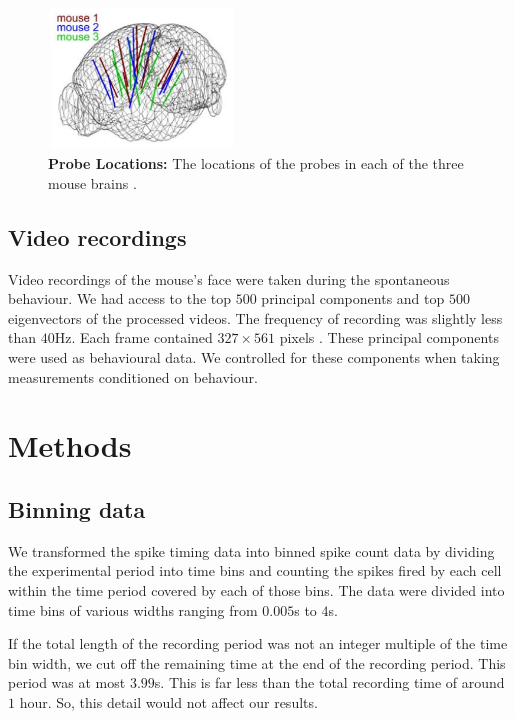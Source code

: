     \begin{figure}[h]
        \centering
        \includegraphics[width=5cm,height=3.75cm]{figures/eight_probe/probe_locations_stringer.png}
        \caption{\textbf{Probe Locations:} The locations of the probes in each of the three mouse brains \parencite{stringer}.}
        \label{fig:probe_locations}
    \end{figure}

    \subsection{Video recordings}\label{sec:video_recordings}
    Video recordings of the mouse's face were taken during the spontaneous behaviour. We had access to the top $500$ principal components and top $500$ eigenvectors of the processed videos. The frequency of recording was slightly less than $40$Hz. Each frame contained $327 \times 561$ pixels \parencite{stringer, steinmetz}. These principal components were used as behavioural data. We controlled for these components when taking measurements conditioned on behaviour.

\section{Methods}
    \subsection{Binning data}
    We transformed the spike timing data into binned spike count data by dividing the experimental period into time bins and counting the spikes fired by each cell within the time period covered by each of those bins. The data were divided into time bins of various widths ranging from $0.005$s to $4$s.

    If the total length of the recording period was not an integer multiple of the time bin width, we cut off the remaining time at the end of the recording period. This period was at most $3.99$s. This is far less than the total recording time of around $1$ hour. So, this detail would not affect our results.

